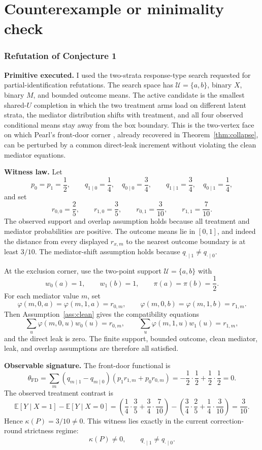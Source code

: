 \documentclass[11pt]{article}
\newcommand{\E}{\mathbb{E}}
\theoremstyle{definition}
\theoremstyle{plain}
\theoremstyle{remark}
\begin{document}
\section{Counterexample or minimality check}
\label{sec:counterexample}
\subsubsection*{Refutation of Conjecture 1}
\textbf{Primitive executed.} I used the two-strata response-type search requested for
partial-identification refutations. The search space has
\(\mathcal U=\{a,b\}\), binary \(X\), binary \(M\), and bounded outcome means.
The active candidate is the smallest shared-\(U\) completion in which the two
treatment arms load on different latent strata, the mediator distribution shifts
with treatment, and all four observed conditional means stay away from the box
boundary. This is the two-vertex face on which Pearl's front-door corner
\cite{Pearl1995CausalDiagrams}, already recovered in Theorem~\ref{thm:collapse},
can be perturbed by a common direct-leak increment without violating the clean
mediator equations.

\textbf{Witness law.} Let
\[
  p_0=p_1=\frac12,\qquad
  q_{1\mid0}=\frac14,\quad q_{0\mid0}=\frac34,\qquad
  q_{1\mid1}=\frac34,\quad q_{0\mid1}=\frac14,
\]
and set
\[
  r_{0,0}=\frac25,\qquad r_{1,0}=\frac35,\qquad
  r_{0,1}=\frac3{10},\qquad r_{1,1}=\frac7{10}.
\]
The observed support and overlap assumption holds because all treatment and
mediator probabilities are positive. The outcome means lie in \([0,1]\), and
indeed the distance from every displayed \(r_{x,m}\) to the nearest outcome
boundary is at least \(3/10\). The mediator-shift assumption holds because
\(q_{\cdot\mid1}\neq q_{\cdot\mid0}\).

At the exclusion corner, use the two-point support \(\mathcal U=\{a,b\}\) with
\[
  w_0(a)=1,\qquad w_1(b)=1,\qquad \pi(a)=\pi(b)=\frac12.
\]
For each mediator value \(m\), set
\[
  \varphi(m,0,a)=\varphi(m,1,a)=r_{0,m},\qquad
  \varphi(m,0,b)=\varphi(m,1,b)=r_{1,m}.
\]
Then Assumption~\ref{ass:clean} gives the compatibility equations
\[
  \sum_u\varphi(m,0,u)w_0(u)=r_{0,m},\qquad
  \sum_u\varphi(m,1,u)w_1(u)=r_{1,m},
\]
and the direct leak is zero. The finite support, bounded outcome, clean mediator,
leak, and overlap assumptions are therefore all satisfied.

\textbf{Observable signature.} The front-door functional is
\[
  \theta_{\mathrm{FD}}
  =\sum_m(q_{m\mid1}-q_{m\mid0})(p_1r_{1,m}+p_0r_{0,m})
  =-\frac12\cdot\frac12+\frac12\cdot\frac12=0.
\]
The observed treatment contrast is
\[
  \E[Y\mid X=1]-\E[Y\mid X=0]
  =\left(\frac14\cdot\frac35+\frac34\cdot\frac7{10}\right)
   -\left(\frac34\cdot\frac25+\frac14\cdot\frac3{10}\right)
  =\frac3{10}.
\]
Hence \(\kappa(P)=3/10\neq0\). This witness lies exactly in the current
correction-round strictness regime:
\[
  \kappa(P)\neq0,\qquad q_{\cdot\mid1}\neq q_{\cdot\mid0}.
\]
\end{document}
